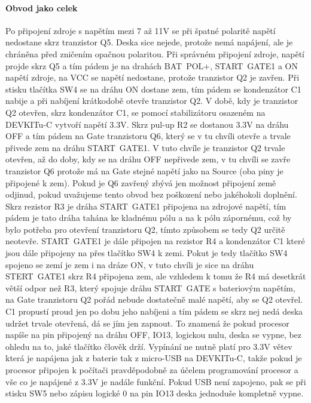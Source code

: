 \documentclass{template/socthesis}
\begin{document}
\begin{itemize}
	\paragraph*{Obvod jako celek}
	Po připojení zdroje s napětím mezi 7 až 11V se při špatné polaritě napětí nedostane skrz tranzistor Q5. Deska sice nejede, protože nemá napájení, ale je chráněna před zničením opačnou polaritou. Při správném připojení zdroje, napětí projde skrz Q5 a tím pádem je na drahách BAT~POL+, START~GATE1 a ON napětí zdroje, na VCC se napětí nedostane, protože tranzistor Q2 je zavřen. Při stisku tlačítka SW4 se na dráhu ON dostane zem, tím pádem se kondenzátor C1 nabije a při nabíjení krátkodobě otevře tranzistor Q2. V době, kdy je tranzistor Q2 otevřen, skrz kondenzátor C1, se pomocí stabilizátoru osazeném na DEVKITu-C vytvoří napětí 3.3V. Skrz pul-up R2 se dostanou 3.3V na dráhu OFF a tím pádem na Gate tranzistoru Q6, který se v tu chvíli otevře a trvale přivede zem na dráhu START~GATE1. V tuto chvíle je tranzistor Q2 trvale otevřen, až do doby, kdy se na dráhu OFF nepřivede zem, v tu chvíli se zavře tranzistor Q6 protože má na Gate stejné napětí jako na Source (oba piny je připojené k zem). Pokud je Q6 zavřený zbývá jen možnost připojení země odjinud, pokud uvažujeme tento obvod bez poškození nebo jakéhokoli doplnění. Skrz rezistor R3 je dráha START~GATE1 připojena na zdrojové napětí, tím pádem je tato dráha tahána ke kladnému pólu a na k pólu zápornému, což by bylo potřeba pro otevření tranzistoru Q2, tímto způsobem se tedy Q2 určitě neotevře.
	START~GATE1 je dále připojen na rezistor R4 a kondenzátor C1 které jsou dále připojeny na přes tlačítko SW4 k zemi. Pokut je tedy tlačítko SW4 spojeno se zemí je zem i na dráze ON, v tuto chvíli je sice na dráhu 
	STERT~GATE1 skrz R4 připojena zem, ale vzhledem
	k tomu že R4 má desetkrát větší odpor než R3, který spojuje dráhu START~GATE s bateriovým napětím, na Gate tranzistoru Q2 pořád nebude dostatečně malé napětí, aby se Q2 otevřel. C1 propustí proud jen po dobu jeho nabíjeni a tím pádem se skrz nej nedá deska udržet trvale otevřená, dá se jím jen zapnout. To znamená že pokud procesor napíše na pin připojený na dráhu OFF, IO13, logickou nulu, deska se vypne, bez ohledu na to, jaké tlačítko člověk drží. Vypínání ne nutně platí pro 3.3V větev která je napájena jak z baterie tak z micro-USB na DEVKITu-C, takže pokud je procesor připojen k počítači pravděpodobně za účelem programování procesor a vše co je napájené z 3.3V je nadále funkční. Pokud USB není zapojeno, pak se při stisku SW5 nebo zápisu logické 0
	na pin IO13 deska jednoduše kompletně vypne.
	

\end{itemize}
\end{document}
